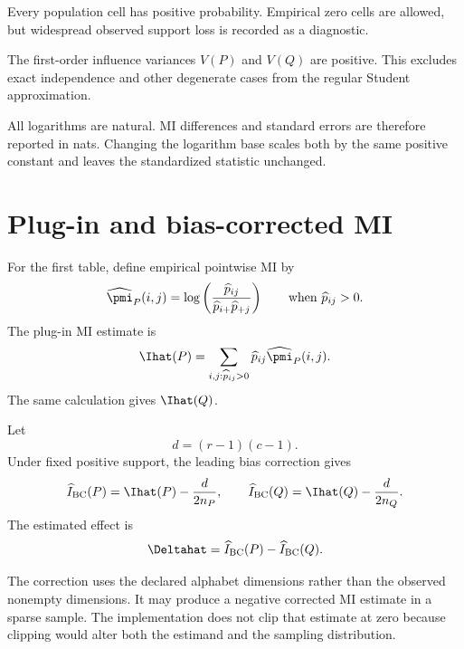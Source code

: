 \begin{assumption}
Every population cell has positive probability. Empirical zero cells are
allowed, but widespread observed support loss is recorded as a diagnostic.
\end{assumption}

\begin{assumption}[Regular MI]
The first-order influence variances \(V(P)\) and \(V(Q)\) are positive. This
excludes exact independence and other degenerate cases from the regular
Student approximation.
\end{assumption}

All logarithms are natural. MI differences and standard errors are therefore
reported in nats. Changing the logarithm base scales both by the same positive
constant and leaves the standardized statistic unchanged.

\section{Plug-in and bias-corrected MI}

For the first table, define empirical pointwise MI by
\begin{equation}
  \widehat\pmi_P(i,j)
  =\log\left(
  \frac{\widehat p_{ij}}
       {\widehat p_{i+}\widehat p_{+j}}
  \right)
  \qquad\text{when }\widehat p_{ij}>0.
  \label{eq:empirical-pmi}
\end{equation}
The plug-in MI estimate is
\begin{equation}
  \Ihat(P)
  =\sum_{i,j:\widehat p_{ij}>0}
  \widehat p_{ij}\widehat\pmi_P(i,j).
  \label{eq:plugin-mi}
\end{equation}
The same calculation gives \(\Ihat(Q)\).

Let
\begin{equation}
  d=(r-1)(c-1).
\end{equation}
Under fixed positive support, the leading bias correction gives
\begin{equation}
  \widehat I_{\mathrm{BC}}(P)
  =\Ihat(P)-\frac{d}{2n_P},
  \qquad
  \widehat I_{\mathrm{BC}}(Q)
  =\Ihat(Q)-\frac{d}{2n_Q}.
  \label{eq:bias-corrected-mi}
\end{equation}
The estimated effect is
\begin{equation}
  \Deltahat
  =\widehat I_{\mathrm{BC}}(P)
  -\widehat I_{\mathrm{BC}}(Q).
  \label{eq:bias-corrected-difference}
\end{equation}

The correction uses the declared alphabet dimensions rather than the observed
nonempty dimensions. It may produce a negative corrected MI estimate in a
sparse sample. The implementation does not clip that estimate at zero because
clipping would alter both the estimand and the sampling distribution.

